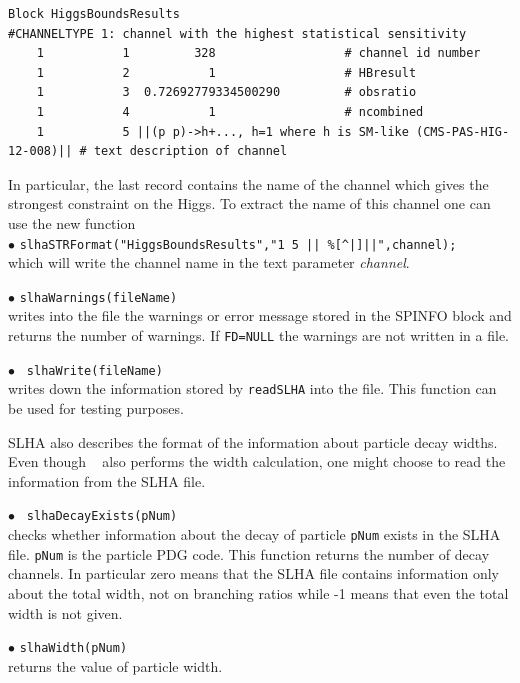 \documentclass[12pt,a4paper]{article}
\begin{document}
{\scriptsize
\begin{verbatim}
Block HiggsBoundsResults 
#CHANNELTYPE 1: channel with the highest statistical sensitivity
    1           1         328                  # channel id number
    1           2           1                  # HBresult
    1           3  0.72692779334500290         # obsratio
    1           4           1                  # ncombined
    1           5 ||(p p)->h+..., h=1 where h is SM-like (CMS-PAS-HIG-12-008)|| # text description of channel
\end{verbatim}
}

\noindent 
In particular, the last record contains  the  name of the channel which gives the strongest constraint on the Higgs.  To extract the name
of this channel one can use the new function\\

\noindent
$\bullet$ \verb!slhaSTRFormat("HiggsBoundsResults","1 5 || %[^|]||",channel);!\\
which will write the channel name  in the text parameter {\it channel}. 

\noindent
$\bullet$ \verb|slhaWarnings(fileName)|\\                                                                              
writes into the file the warnings or error message  stored in the SPINFO block and
returns the number of warnings. If \verb|FD=NULL| the warnings are not written in a file.

\noindent
$\bullet$ \verb| slhaWrite(fileName)|\\
 writes down the information stored by 
\verb|readSLHA| into the file. This function can be used for testing purposes. 

SLHA  also describes the format of the information about particle decay widths.  
Even though \micro~ also performs the width calculation, one might choose to read the information from the SLHA file. 
 


\noindent
$\bullet$ \verb| slhaDecayExists(pNum)|\\
checks whether information about the  decay of particle \verb|pNum| exists in the SLHA file. 
\verb|pNum| is the particle PDG code. This function returns the number 
of decay channels. 
In particular zero means that the SLHA file contains  information only about the total width, not on branching ratios while 
-1 means that even the total width is not given.

\noindent
$\bullet$ \verb|slhaWidth(pNum)|\\ returns the value of particle width.
\end{document}

